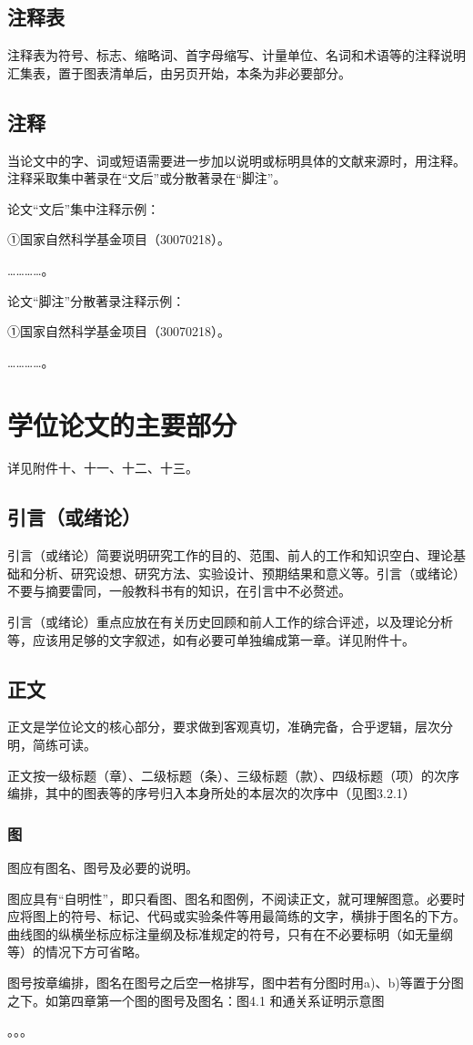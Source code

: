 \subsection{注释表}
注释表为符号、标志、缩略词、首字母缩写、计量单位、名词和术语等的注释说明汇集表，置于图表清单后，由另页开始，本条为非必要部分。

\subsection{注释}
当论文中的字、词或短语需要进一步加以说明或标明具体的文献来源时，用注释。注释采取集中著录在“文后”或分散著录在“脚注”。

论文“文后”集中注释示例：

①国家自然科学基金项目（30070218）。


…………。

论文“脚注”分散著录注释示例：

①国家自然科学基金项目（30070218）。


…………。

\section{学位论文的主要部分}
详见附件十、十一、十二、十三。

\subsection{引言（或绪论）}
引言（或绪论）简要说明研究工作的目的、范围、前人的工作和知识空白、理论基础和分析、研究设想、研究方法、实验设计、预期结果和意义等。引言（或绪论）不要与摘要雷同，一般教科书有的知识，在引言中不必赘述。

引言（或绪论）重点应放在有关历史回顾和前人工作的综合评述，以及理论分析等，应该用足够的文字叙述，如有必要可单独编成第一章。详见附件十。

\subsection{正文}
正文是学位论文的核心部分，要求做到客观真切，准确完备，合乎逻辑，层次分明，简练可读。

正文按一级标题（章）、二级标题（条）、三级标题（款）、四级标题（项）的次序编排，其中的图表等的序号归入本身所处的本层次的次序中（见图3.2.1）

\subsubsection{图}
图应有图名、图号及必要的说明。

图应具有“自明性”，即只看图、图名和图例，不阅读正文，就可理解图意。必要时应将图上的符号、标记、代码或实验条件等用最简练的文字，横排于图名的下方。曲线图的纵横坐标应标注量纲及标准规定的符号，只有在不必要标明（如无量纲等）的情况下方可省略。

图号按章编排，图名在图号之后空一格排写，图中若有分图时用a)、b)等置于分图之下。如第四章第一个图的图号及图名：图4.1 和通关系证明示意图

。。。

